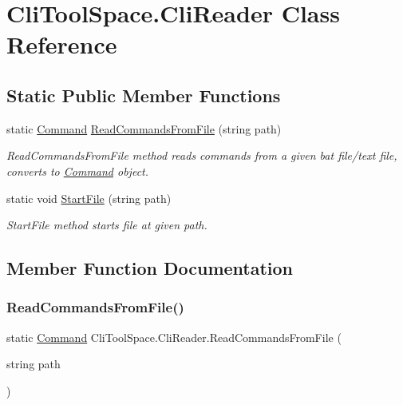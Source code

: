 \hypertarget{class_cli_tool_space_1_1_cli_reader}{}\section{Cli\+Tool\+Space.\+Cli\+Reader Class Reference}
\label{class_cli_tool_space_1_1_cli_reader}
\subsection*{Static Public Member Functions}
\begin{DoxyCompactItemize}
\item 
static \mbox{\hyperlink{class_cli_tool_space_1_1_command}{Command}} \mbox{\hyperlink{class_cli_tool_space_1_1_cli_reader_afff87379b5096167fb8f2cacd8cc5436}{Read\+Commands\+From\+File}} (string path)
\begin{DoxyCompactList}\small\item\em Read\+Commands\+From\+File method reads commands from a given bat file/text file, converts to \mbox{\hyperlink{class_cli_tool_space_1_1_command}{Command}} object. \end{DoxyCompactList}\item 
static void \mbox{\hyperlink{class_cli_tool_space_1_1_cli_reader_ad5a2e2c127e76205a40d63d14e5abeb4}{Start\+File}} (string path)
\begin{DoxyCompactList}\small\item\em Start\+File method starts file at given path. \end{DoxyCompactList}\end{DoxyCompactItemize}


\subsection{Member Function Documentation}
\mbox{\label{class_cli_tool_space_1_1_cli_reader_afff87379b5096167fb8f2cacd8cc5436}} 
\subsubsection{\texorpdfstring{ReadCommandsFromFile()}{ReadCommandsFromFile()}}
{\footnotesize\ttfamily static \mbox{\hyperlink{class_cli_tool_space_1_1_command}{Command}} Cli\+Tool\+Space.\+Cli\+Reader.\+Read\+Commands\+From\+File (\begin{DoxyParamCaption}\item[{string}]{path }\end{DoxyParamCaption})\hspace{0.3cm}{\ttfamily [static]}}



